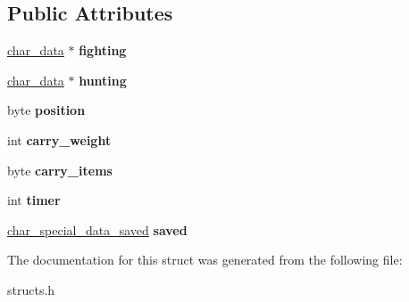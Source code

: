 \subsection*{Public Attributes}
\begin{DoxyCompactItemize}
\item 
\mbox{\label{structchar__special__data_acdcf89dd5af476d01ca4c07a6ae13a94}} 
\hyperlink{structchar__data}{char\+\_\+data} $\ast$ {\bfseries fighting}
\item 
\mbox{\label{structchar__special__data_a1acfc0f82818c6b0cb053fcb8e24d2a0}} 
\hyperlink{structchar__data}{char\+\_\+data} $\ast$ {\bfseries hunting}
\item 
\mbox{\label{structchar__special__data_a30dbaea81960894f4b0b28f9395634ee}} 
byte {\bfseries position}
\item 
\mbox{\label{structchar__special__data_af45ba585bd3aded90facc3d84b0f9446}} 
int {\bfseries carry\+\_\+weight}
\item 
\mbox{\label{structchar__special__data_ac03900e6c287808bfacbd5a45570b5bd}} 
byte {\bfseries carry\+\_\+items}
\item 
\mbox{\label{structchar__special__data_af24f1aeea7724e77730e682143343cb4}} 
int {\bfseries timer}
\item 
\mbox{\label{structchar__special__data_af219088b50a164c18fd8a128305b3b0c}} 
\hyperlink{structchar__special__data__saved}{char\+\_\+special\+\_\+data\+\_\+saved} {\bfseries saved}
\end{DoxyCompactItemize}


The documentation for this struct was generated from the following file\+:\begin{DoxyCompactItemize}
\item 
structs.\+h\end{DoxyCompactItemize}
